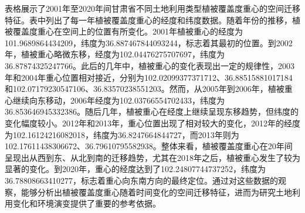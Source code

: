 \documentclass[AutoFakeBold]{LZUThesis-PgD&PhD}
\begin{document}
        \par 表格展示了2001年至2020年间甘肃省不同土地利用类型植被覆盖度重心的空间迁移特征。表中列出了每一年植被覆盖度重心的经度和纬度数据。随着年份的推移，植被覆盖度重心在空间上的位置有所变化。2001年植被重心的经度为101.9689864434209，纬度为36.887467844093244，标志着其最初的位置。到2002年，植被重心略微东移，经度为102.04476275707697，纬度为36.87874325247766。此后的几年中，植被重心的变化表现出一定的规律性，2003年和2004年重心位置相对接近，分别为102.02099377371712、36.88515881017184和102.07179230547106、36.83570238551203。然而，从2005年到2006年，植被重心继续向东移动，2006年经度为102.03766554702433，纬度为36.853646945332386。随后几年，植被重心在经度上继续呈现东移趋势，但纬度的变化幅度较小。2012年和2013年，重心位置出现了相对较大的变化，2012年的经度为102.16124216082018，纬度为36.8247664844727，而2013年则为102.17611438306672、36.79610795582938。整体来看，植被覆盖度重心在20年间呈现出从西到东、从北到南的迁移趋势，尤其在2018年之后，植被重心发生了较为显著的变化。到2020年，重心的经度达到了102.24807744737252，纬度为36.78808663410277，标志着重心向东南方向的最终定位。通过对这些数据的观察，能够分析出植被覆盖度重心随着时间变化的空间迁移特征，进而为研究土地利用变化和环境演变提供了重要的参考依据。
		
\end{document}
